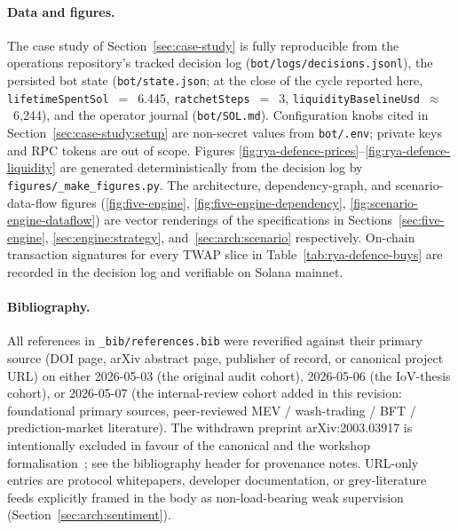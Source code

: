\documentclass[11pt,a4paper]{article}
\begin{document}
\paragraph{Data and figures.} The case study of Section~\ref{sec:case-study} is
fully reproducible from the operations repository's tracked decision log
(\texttt{bot/logs/decisions.jsonl}), the persisted bot state
(\texttt{bot/state.json}; at the close of the cycle reported here,
\texttt{lifetimeSpentSol}~$=$~6.445, \texttt{ratchetSteps}~$=$~3,
\texttt{liquidityBaselineUsd}~$\approx$~6{,}244), and the operator journal
(\texttt{bot/SOL.md}). Configuration knobs cited in
Section~\ref{sec:case-study:setup} are non-secret values from \texttt{bot/.env};
private keys and RPC tokens are out of scope. Figures
\ref{fig:rya-defence-prices}--\ref{fig:rya-defence-liquidity} are generated
deterministically from the decision log by \texttt{figures/\_make\_figures.py}.
The architecture, dependency-graph, and scenario-data-flow figures
(\ref{fig:five-engine}, \ref{fig:five-engine-dependency},
\ref{fig:scenario-engine-dataflow}) are vector renderings of the specifications
in Sections~\ref{sec:five-engine}, \ref{sec:engine:strategy},
and~\ref{sec:arch:scenario} respectively. On-chain transaction signatures for
every TWAP slice in Table~\ref{tab:rya-defence-buys} are recorded in the
decision log and verifiable on Solana mainnet.

\paragraph{Bibliography.} All references in \texttt{\_bib/references.bib} were
reverified against their primary source (DOI page, arXiv abstract page,
publisher of record, or canonical project URL) on either 2026-05-03 (the
original audit cohort), 2026-05-06 (the IoV-thesis cohort), or 2026-05-07 (the
internal-review cohort added in this revision: foundational primary sources,
peer-reviewed MEV / wash-trading / BFT / prediction-market literature). The
withdrawn preprint arXiv:2003.03917 is intentionally excluded in favour of the
canonical \cite{rao2021bittensor} and the workshop
formalisation~\cite{steeves2022incentivizing}; see the bibliography header for
provenance notes. URL-only entries are protocol whitepapers, developer
documentation, or grey-literature feeds explicitly framed in the body as
non-load-bearing weak supervision (Section~\ref{sec:arch:sentiment}).
\end{document}
